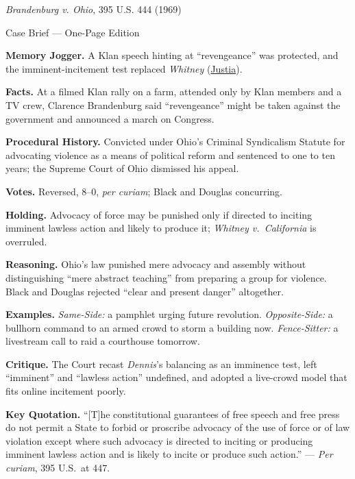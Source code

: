 \documentclass[12pt]{article}
\begin{document}
\begin{center}
{\Large \textit{Brandenburg v. Ohio}, 395 U.S. 444 (1969)\par}
\vspace{0.3em}
{\normalsize Case Brief --- One-Page Edition\par}
\end{center}

\textbf{Memory Jogger.} A Klan speech hinting at ``revengeance'' was protected, and the imminent-incitement test replaced \textit{Whitney} (\href{https://supreme.justia.com/cases/federal/us/395/444/}{Justia}).

\textbf{Facts.} At a filmed Klan rally on a farm, attended only by Klan members and a TV crew, Clarence Brandenburg said ``revengeance'' might be taken against the government and announced a march on Congress.

\textbf{Procedural History.} Convicted under Ohio's Criminal Syndicalism Statute for advocating violence as a means of political reform and sentenced to one to ten years; the Supreme Court of Ohio dismissed his appeal.

\textbf{Votes.} Reversed, 8--0, \emph{per curiam}; Black and Douglas concurring.

\textbf{Holding.} Advocacy of force may be punished only if directed to inciting imminent lawless action and likely to produce it; \textit{Whitney v.\ California} is overruled.

\textbf{Reasoning.} Ohio's law punished mere advocacy and assembly without distinguishing ``mere abstract teaching'' from preparing a group for violence. Black and Douglas rejected ``clear and present danger'' altogether.

\textbf{Examples.} \emph{Same-Side:} a pamphlet urging future revolution. \emph{Opposite-Side:} a bullhorn command to an armed crowd to storm a building now. \emph{Fence-Sitter:} a livestream call to raid a courthouse tomorrow.

\textbf{Critique.} The Court recast \textit{Dennis}'s balancing as an imminence test, left ``imminent'' and ``lawless action'' undefined, and adopted a live-crowd model that fits online incitement poorly.

\textbf{Key Quotation.} ``[T]he constitutional guarantees of free speech and free press do not permit a State to forbid or proscribe advocacy of the use of force or of law violation except where such advocacy is directed to inciting or producing imminent lawless action and is likely to incite or produce such action.'' --- \emph{Per curiam}, 395 U.S.\ at 447.
\end{document}
